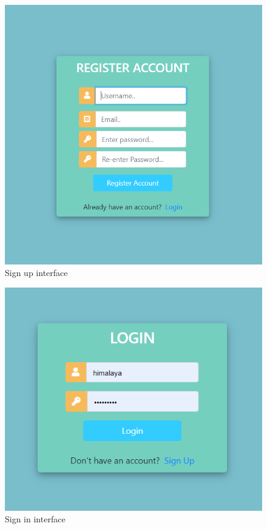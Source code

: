 \begin{figure}[H]
	\centering
	\includegraphics[scale=0.4]{images/signup.png}
	\caption{Sign up interface} %
	\label{figsignup} %
\end{figure}

\begin{figure}[H]
	\centering
	\includegraphics[scale=0.5]{images/login.png}
	\caption{Sign in interface} %
	\label{figlogin} %
\end{figure}

